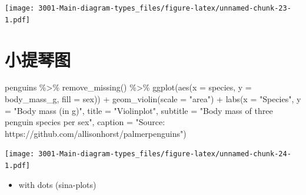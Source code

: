 \documentclass[
]{book}
\newenvironment{Shaded}{\begin{snugshade}}{\end{snugshade}}
\newcommand{\AttributeTok}[1]{\textcolor[rgb]{0.77,0.63,0.00}{#1}}
\newcommand{\FunctionTok}[1]{\textcolor[rgb]{0.00,0.00,0.00}{#1}}
\newcommand{\NormalTok}[1]{#1}
\newcommand{\SpecialCharTok}[1]{\textcolor[rgb]{0.00,0.00,0.00}{#1}}
\newcommand{\StringTok}[1]{\textcolor[rgb]{0.31,0.60,0.02}{#1}}
\providecommand{\tightlist}{%
  \setlength{\itemsep}{0pt}\setlength{\parskip}{0pt}}
\begin{document}
\texttt{[image: 3001-Main-diagram-types\_files/figure-latex/unnamed-chunk-23-1.pdf]}

\hypertarget{ux5c0fux63d0ux7434ux56fe-1}{%
\section{小提琴图}\label{ux5c0fux63d0ux7434ux56fe-1}}

\begin{Shaded}
\begin{Highlighting}[]
\NormalTok{penguins }\SpecialCharTok{\%\textgreater{}\%}
    \FunctionTok{remove\_missing}\NormalTok{() }\SpecialCharTok{\%\textgreater{}\%}
    \FunctionTok{ggplot}\NormalTok{(}\FunctionTok{aes}\NormalTok{(}\AttributeTok{x =}\NormalTok{ species, }\AttributeTok{y =}\NormalTok{ body\_mass\_g,}
               \AttributeTok{fill =}\NormalTok{ sex)) }\SpecialCharTok{+}
    \FunctionTok{geom\_violin}\NormalTok{(}\AttributeTok{scale =} \StringTok{"area"}\NormalTok{) }\SpecialCharTok{+}
      \FunctionTok{labs}\NormalTok{(}\AttributeTok{x =} \StringTok{"Species"}\NormalTok{, }
           \AttributeTok{y =} \StringTok{"Body mass (in g)"}\NormalTok{,}
          \AttributeTok{title =} \StringTok{"Violinplot"}\NormalTok{, }
          \AttributeTok{subtitle =} \StringTok{"Body mass of three penguin species per sex"}\NormalTok{,}
          \AttributeTok{caption =} \StringTok{"Source: https://github.com/allisonhorst/palmerpenguins"}\NormalTok{)}
\end{Highlighting}
\end{Shaded}

\texttt{[image: 3001-Main-diagram-types\_files/figure-latex/unnamed-chunk-24-1.pdf]}

\begin{itemize}
\tightlist
\item
  with dots (sina-plots)
\end{itemize}
\end{document}
